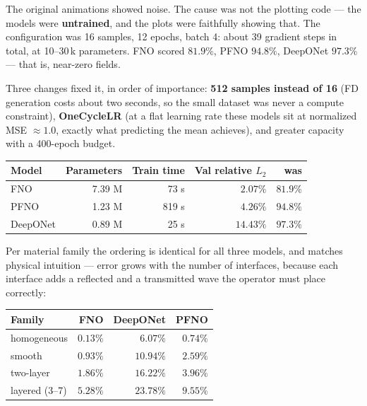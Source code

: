 \documentclass[11pt,a4paper]{article}
\newcommand{\relL}{relative $L_2$}
\begin{document}
The original animations showed noise. The cause was not the plotting code ---
the models were \textbf{untrained}, and the plots were faithfully showing that.
The configuration was 16 samples, 12 epochs, batch 4: about 39 gradient steps in
total, at 10--30\,k parameters. FNO scored $81.9\%$, PFNO $94.8\%$, DeepONet
$97.3\%$ --- that is, near-zero fields.

Three changes fixed it, in order of importance: \textbf{512 samples instead of
16} (FD generation costs about two seconds, so the small dataset was never a
compute constraint), \textbf{OneCycleLR} (at a flat learning rate these models
sit at normalized MSE $\approx1.0$, exactly what predicting the mean achieves),
and greater capacity with a 400-epoch budget.

\begin{center}
\small
\begin{tabular}{lrrrr}
\toprule
\textbf{Model} & \textbf{Parameters} & \textbf{Train time} & \textbf{Val \relL{}} & \textbf{was}\\
\midrule
FNO      & 7.39 M & 73 s  & $\mathbf{2.07\%}$  & $81.9\%$\\
PFNO     & 1.23 M & 819 s & $\mathbf{4.26\%}$  & $94.8\%$\\
DeepONet & 0.89 M & 25 s  & $\mathbf{14.43\%}$ & $97.3\%$\\
\bottomrule
\end{tabular}
\end{center}

Per material family the ordering is identical for all three models, and matches
physical intuition --- error grows with the number of interfaces, because each
interface adds a reflected and a transmitted wave the operator must place
correctly:

\begin{center}
\small
\begin{tabular}{lrrr}
\toprule
\textbf{Family} & \textbf{FNO} & \textbf{DeepONet} & \textbf{PFNO}\\
\midrule
homogeneous    & $0.13\%$ & $6.07\%$  & $0.74\%$\\
smooth         & $0.93\%$ & $10.94\%$ & $2.59\%$\\
two-layer      & $1.86\%$ & $16.22\%$ & $3.96\%$\\
layered (3--7) & $5.28\%$ & $23.78\%$ & $9.55\%$\\
\bottomrule
\end{tabular}
\end{center}
\end{document}
